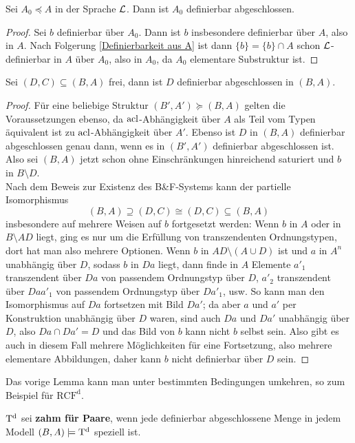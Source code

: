 \begin{corollary}
	Sei $A_0\preceq A$ in der Sprache $\mathcal{L}$. Dann ist $A_0$ definierbar abgeschlossen.
\end{corollary}
\begin{proof}
	Sei $b$ definierbar über $A_0$. Dann ist $b$ insbesondere definierbar über $A$, also in $A$. Nach Folgerung \ref{Definierbarkeit aus A} ist dann $\{b\}=\{b\}\cap A$ schon $\mathcal{L}$-definierbar in $A$ über $A_0$, also in $A_0$, da $A_0$ elementare Substruktur ist.
\end{proof}

\begin{lemma}\label{Freie Definierbarkeit}
	Sei $(D,C)\subseteq(B,A)$ frei, dann ist $D$ definierbar abgeschlossen in $(B,A)$.
\end{lemma}
\begin{proof}
	Für eine beliebige Struktur $(B',A')\succeq (B,A)$ gelten die Voraussetzungen ebenso, da $\operatorname{acl}$-Abhängigkeit über $A$ als Teil vom Typen äquivalent ist zu $\operatorname{acl}$-Abhängigkeit über $A'$. Ebenso ist $D$ in $(B,A)$ definierbar abgeschlossen genau dann, wenn es in $(B',A')$ definierbar abgeschlossen ist. Also sei $(B,A)$ jetzt schon ohne Einschränkungen hinreichend saturiert und $b$ in $B\setminus D$.\\
	Nach dem Beweis zur Existenz des B\&F-Systems kann der partielle Isomorphismus $$(B,A)\supseteq(D,C)\cong(D,C)\subseteq(B,A)$$ insbesondere auf mehrere Weisen auf $b$ fortgesetzt werden: Wenn $b$ in $A$ oder in $B\setminus AD$ liegt, ging es nur um die Erfüllung von transzendenten Ordnungstypen, dort hat man also mehrere Optionen. Wenn $b$ in $AD\setminus(A\cup D)$ ist und $a$ in $A^n$ unabhängig über $D$, sodass $b$ in $Da$ liegt, dann finde in $A$ Elemente $a'_1$ transzendent über $Da$ von passendem Ordnungstyp über $D$, $a'_2$ transzendent über $Daa'_1$ von passendem Ordnungstyp über $Da'_1$, usw.\newpage
	So kann man den Isomorphismus auf $Da$ fortsetzen mit Bild $Da'$; da aber $a$ und $a'$ per Konstruktion unabhängig über $D$ waren, sind auch $Da$ und $Da'$ unabhängig über $D$, also $Da\cap Da'=D$ und das Bild von $b$ kann nicht $b$ selbst sein. Also gibt es auch in diesem Fall mehrere Möglichkeiten für eine Fortsetzung, also mehrere elementare Abbildungen, daher kann $b$ nicht definierbar über $D$ sein.
\end{proof}

Das vorige Lemma kann man unter bestimmten Bedingungen umkehren, so zum Beispiel für $\operatorname{RCF^d}$.
\begin{definition}
	$\operatorname{T^d}$ sei \textbf{zahm für Paare}, wenn jede definierbar abgeschlossene Menge in jedem Modell $(B,A)\models\operatorname{T^d}$ speziell ist.
\end{definition}

